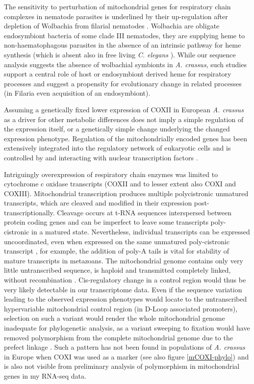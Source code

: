 The sensitivity to perturbation of mitochondrial genes for respiratory
chain complexes in nematode parasites is underlined by their
up-regulation after depletion of Wolbachia from filarial nematodes
\cite{pmid20362581, pmid19806204}. Wolbachia are obligate endosymbiont
bacteria of some clade III nematodes, they are supplying heme to
non-haematophagous parasites in the absence of an intrinsic pathway
for heme synthesis \cite{ghedin_draft_2007} (which is absent also in
free living \textit{C. elegans} \cite{pmid15767563}). While our
sequence analysis suggests the absence of wolbachial symbionts in
\textit{A. crassus}, such studies support a central role of host or
endosymbiont derived heme for respiratory processes and suggest a
propensity for evolutionary change in related processes (in Filaria
even acquisition of an endosymbiont).

Assuming a genetically fixed lower expression of COXII in European
\textit{A. crassus} as a driver for other metabolic differences does
not imply a simple regulation of the expression itself, or a
genetically simple change underlying the changed expression
phenotype. Regulation of the mitochondrially encoded genes has been
extensively integrated into the regulatory network of eukaryotic
cells and is controlled by and interacting with nuclear transcription
factors \cite{pmid8289797}.

Intriguingly overexpression of respiratory chain enzymes was limited
to cytochrome c oxidase transcripts (COXII and to lesser extent also
COXI and COXIII). Mitochondrial transcription produces multiple
polycistronic unmatured transcripts, which are cleaved and modified in
their expression post-transcriptionally. Cleavage occurs at t-RNA
sequences interspersed between protein coding genes and can be
imperfect to leave some transcripts poly-cistronic in a matured
state. Nevertheless, individual transcripts can be expressed
uncoordinated, even when expressed on the same unmatured
poly-cistronic transcript \cite{pmid19843606}, for example, the
addition of poly-A tails is vital for stability of mature transcripts
in metazoans. The mitochondrial genome contains only very little
untranscribed sequence, is haploid and transmitted completely linked,
without recombination \cite{pmid18023115}. Cis-regulatory change in a
control region would thus be very likely detectable in our
transcriptome data. Even if the sequence variation leading to the
observed expression phenotypes would locate to the untranscribed
hypervariable mitochondrial control region (in D-Loop associated
promoters), selection on such a variant would render the whole
mitochondrial genome inadequate for phylogenetic analysis, as a
variant sweeping to fixation would have removed polymorphism from the
complete mitochondrial genome due to the prefect linkage
\cite{pmid19821901}. Such a pattern has not been found in populations
of \textit{A. crassus} in Europe when COXI was used as a marker
\cite{dl_py} (see also figure \ref{mCOXI-phylo}) and is also not
visible from preliminary analysis of polymorphism in mitochondrial
genes in my RNA-seq data.

